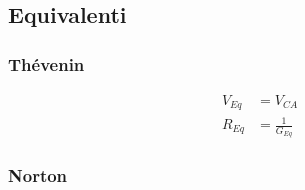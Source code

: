 \documentclass[10pt]{article}
\begin{document}
    \begin{minipage}[t]{.7\textwidth}
        
        \subsection*{Equivalenti}

            \begin{minipage}[t]{.5\textwidth}
                \vspace{-\baselineskip}
                
                \subsubsection*{Thévenin}

                    \begin{minipage}[t]{.3\textwidth}
                        \vspace{-\baselineskip}

                        

                    \end{minipage}
                    \hfill
                    \begin{minipage}[t]{.7\textwidth}

                        \begin{align*}
                            V_{Eq} &= V_{CA}\\
                            R_{Eq} &= \frac{1}{G_{Eq}}
                        \end{align*}

                    \end{minipage}

            \end{minipage}
            \hfill
            \begin{minipage}[t]{.5\textwidth}
                \vspace{-\baselineskip}
                
                \subsubsection*{Norton}

                    \begin{minipage}[t]{.3\textwidth}
                        \vspace{-\baselineskip}


\end{minipage}
\end{minipage}
\end{minipage}
\end{document}
